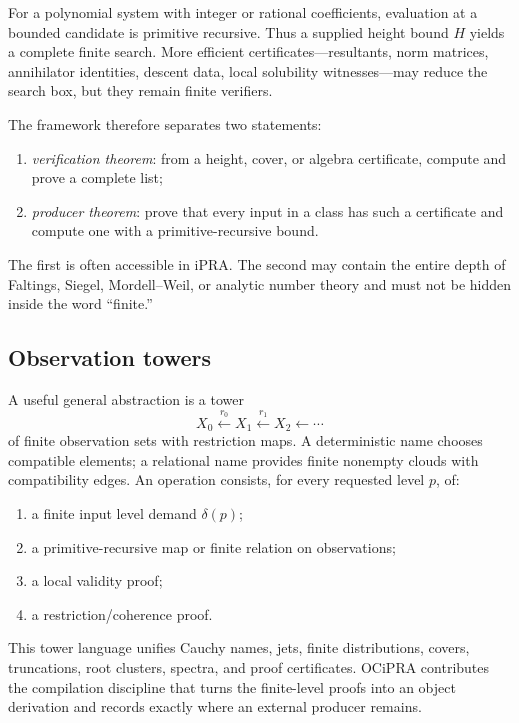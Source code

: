 For a polynomial system with integer or rational coefficients, evaluation at a bounded candidate is primitive recursive.  Thus a supplied height bound $H$ yields a complete finite search.  More efficient certificates---resultants, norm matrices, annihilator identities, descent data, local solubility witnesses---may reduce the search box, but they remain finite verifiers.

The framework therefore separates two statements:

\begin{enumerate}
  \item \emph{verification theorem}: from a height, cover, or algebra certificate, compute and prove a complete list;
  \item \emph{producer theorem}: prove that every input in a class has such a certificate and compute one with a primitive-recursive bound.
\end{enumerate}

The first is often accessible in iPRA.  The second may contain the entire depth of Faltings, Siegel, Mordell--Weil, or analytic number theory and must not be hidden inside the word ``finite.''

\subsection{Observation towers}

A useful general abstraction is a tower
\[
 X_0 \xleftarrow{r_0} X_1 \xleftarrow{r_1} X_2\xleftarrow{}\cdots
\]
of finite observation sets with restriction maps.  A deterministic name chooses compatible elements; a relational name provides finite nonempty clouds with compatibility edges.  An operation consists, for every requested level $p$, of:

\begin{enumerate}
  \item a finite input level demand $\delta(p)$;
  \item a primitive-recursive map or finite relation on observations;
  \item a local validity proof;
  \item a restriction/coherence proof.
\end{enumerate}

This tower language unifies Cauchy names, jets, finite distributions, covers, truncations, root clusters, spectra, and proof certificates.  OCiPRA contributes the compilation discipline that turns the finite-level proofs into an object derivation and records exactly where an external producer remains.
